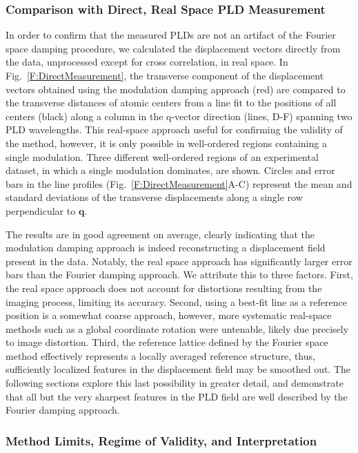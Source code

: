 \documentclass[12pt]{article}
\begin{document}
\subsubsection*{Comparison with Direct, Real Space PLD Measurement}

In order to confirm that the measured PLDs are not an artifact of the Fourier space damping procedure, we calculated the displacement vectors directly from the data, unprocessed except for cross correlation, in real space.
In Fig.~\ref{F:DirectMeasurement}, the transverse component of the displacement vectors obtained using the modulation damping approach (red) are compared to the transverse distances of atomic centers from a line fit to the positions of all centers (black) along a column in the q-vector direction (lines, D-F) spanning two PLD wavelengths.
This real-space approach useful for confirming the validity of the method, however, it is only possible in well-ordered regions containing a single modulation.
Three different well-ordered regions of an experimental dataset, in which a single modulation dominates, are shown.  
Circles and error bars in the line profiles (Fig.~\ref{F:DirectMeasurement}A-C) represent the mean and standard deviations of the transverse displacements along a single row perpendicular to $\mathbf{q}$.



The results are in good agreement on average, clearly indicating that the modulation damping approach is indeed reconstructing a displacement field present in the data.
Notably, the real space approach has significantly larger error bars than the Fourier damping approach.
We attribute this to three factors.
First, the real space approach does not account for distortions resulting from the imaging process, limiting its accuracy.
Second, using a best-fit line as a reference position is a somewhat coarse approach, however, more systematic real-space methods such as a global coordinate rotation were untenable, likely due precisely to image distortion. 
Third, the reference lattice defined by the Fourier space method effectively represents a locally averaged reference structure, thus, sufficiently localized features in the displacement field may be smoothed out.
The following sections explore this last possibility in greater detail, and demonstrate that all but the very sharpest features in the PLD field are well described by the Fourier damping approach.



\subsubsection*{Method Limits, Regime of Validity, and Interpretation}
\end{document}
